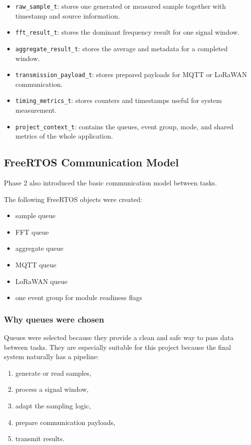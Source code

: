 \documentclass[12pt,a4paper]{article}
\begin{document}
\begin{itemize}
    \item \texttt{raw\_sample\_t}: stores one generated or measured sample
    together with timestamp and source information.
    \item \texttt{fft\_result\_t}: stores the dominant frequency result for one
    signal window.
    \item \texttt{aggregate\_result\_t}: stores the average and metadata for a
    completed window.
    \item \texttt{transmission\_payload\_t}: stores prepared payloads for MQTT
    or LoRaWAN communication.
    \item \texttt{timing\_metrics\_t}: stores counters and timestamps useful for
    system measurement.
    \item \texttt{project\_context\_t}: contains the queues, event group, mode,
    and shared metrics of the whole application.
\end{itemize}

\subsection{FreeRTOS Communication Model}

Phase 2 also introduced the basic communication model between tasks.

The following FreeRTOS objects were created:

\begin{itemize}
    \item sample queue
    \item FFT queue
    \item aggregate queue
    \item MQTT queue
    \item LoRaWAN queue
    \item one event group for module readiness flags
\end{itemize}

\subsubsection*{Why queues were chosen}

Queues were selected because they provide a clean and safe way to pass data
between tasks. They are especially suitable for this project because the final
system naturally has a pipeline:

\begin{enumerate}[label=\arabic*.]
    \item generate or read samples,
    \item process a signal window,
    \item adapt the sampling logic,
    \item prepare communication payloads,
    \item transmit results.
\end{enumerate}
\end{document}
